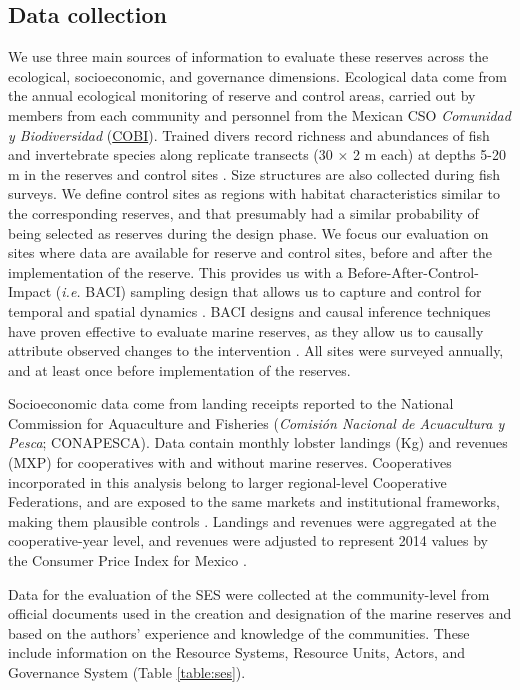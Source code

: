 \documentclass{frontiersSCNS}
\begin{document}
\subsection{Data collection}\label{data-collection}

We use three main sources of information to evaluate these reserves
across the ecological, socioeconomic, and governance dimensions.
Ecological data come from the annual ecological monitoring of reserve
and control areas, carried out by members from each community and
personnel from the Mexican CSO \emph{Comunidad y Biodiversidad}
(\href{www.cobi.org.mx}{COBI}). Trained divers record richness and
abundances of fish and invertebrate species along replicate transects
(30 \(\times\) 2 m each) at depths 5-20 m in the reserves and control
sites \citep{fulton_2018,fulton_2019,suman_2010-ez}. Size structures are
also collected during fish surveys. We define control sites as regions
with habitat characteristics similar to the corresponding reserves, and
that presumably had a similar probability of being selected as reserves
during the design phase. We focus our evaluation on sites where data are
available for reserve and control sites, before and after the
implementation of the reserve. This provides us with a
Before-After-Control-Impact (\emph{i.e.} BACI) sampling design that
allows us to capture and control for temporal and spatial dynamics
\citep{depalma_2018,ferraro_2006-oW}. BACI designs and causal inference
techniques have proven effective to evaluate marine reserves, as they
allow us to causally attribute observed changes to the intervention
\citep{moland_2013-VP,Villasenor-Derbez_2018}. All sites were surveyed
annually, and at least once before implementation of the reserves.

Socioeconomic data come from landing receipts reported to the National
Commission for Aquaculture and Fisheries (\emph{Comisión Nacional de
Acuacultura y Pesca}; CONAPESCA). Data contain monthly lobster landings
(Kg) and revenues (MXP) for cooperatives with and without marine
reserves. Cooperatives incorporated in this analysis belong to larger
regional-level Cooperative Federations, and are exposed to the same
markets and institutional frameworks, making them plausible controls
\citep{mccay_2017-1m,ayer_2018}. Landings and revenues were aggregated
at the cooperative-year level, and revenues were adjusted to represent
2014 values by the Consumer Price Index for Mexico \citep{oecd_2017-VV}.

Data for the evaluation of the SES were collected at the community-level
from official documents used in the creation and designation of the
marine reserves
\citep{dof_website_2012,dof_website_2013,dof_website_2018} and based on
the authors' experience and knowledge of the communities. These include
information on the Resource Systems, Resource Units, Actors, and
Governance System (Table \ref{table:ses}).
\end{document}
